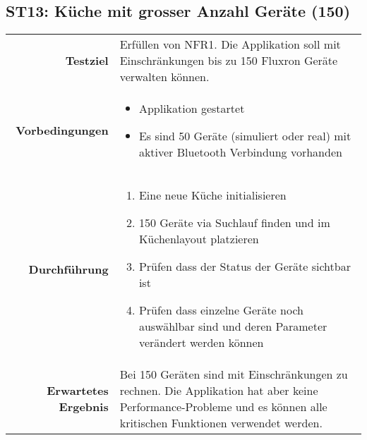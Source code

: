 \subsection{ST13: Küche mit grosser Anzahl Geräte (150)}
\begin{table}[H]
\begin{tabularx}{\textwidth}{r X }
\textbf{Testziel} & Erfüllen von \ac{NFR}1. Die Applikation soll mit Einschränkungen bis zu 150 Fluxron Geräte verwalten können.\\
\textbf{Vorbedingungen} & \begin{itemize}
\item Applikation gestartet
\item Es sind 50 Geräte (simuliert oder real) mit aktiver Bluetooth Verbindung vorhanden
\end{itemize} \\
\textbf{Durchführung} & \begin{enumerate}
\item Eine neue Küche initialisieren
\item 150 Geräte via Suchlauf finden und im Küchenlayout platzieren
\item Prüfen dass der Status der Geräte sichtbar ist
\item Prüfen dass einzelne Geräte noch auswählbar sind und deren Parameter verändert werden können
\end{enumerate} \\
\textbf{Erwartetes Ergebnis} & Bei 150 Geräten sind mit Einschränkungen %
zu rechnen. Die Applikation hat aber keine Performance-Probleme und es können alle kritischen Funktionen verwendet werden.\\
\end{tabularx}
\end{table}

